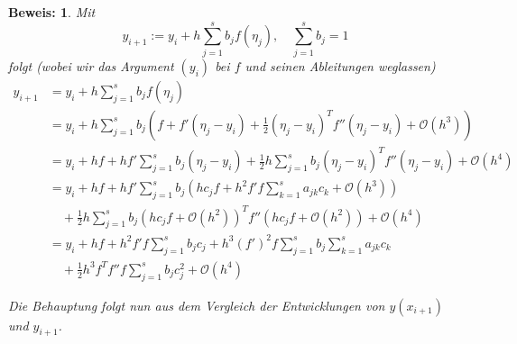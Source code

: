 \documentclass[
]{mycourse}
\theoremstyle{mythm}
\theoremstyle{break}
\newtheorem*{beweis}{Beweis:}
\begin{document}
\begin{beweis}
Mit 
\[
y_{i+1}:=y_i +  h \sum_{j=1}^s b_j f(\eta_j), \quad \sum_{j=1}^s b_j=1
\]
folgt (wobei wir das Argument $(y_i)$ bei $f$ und seinen Ableitungen weglassen)
\begin{align*}
y_{i+1} &= y_i +  h \sum_{j=1}^s b_j f(\eta_j)\\
&=  y_i + h  \sum_{j=1}^s b_j \left( f + f' (\eta_j-y_i) + \frac{1}{2} (\eta_j-y_i)^T f'' (\eta_j-y_i)  + \mathcal{O}(h^3) \right)\\
&= y_i + h f + h f'  \sum_{j=1}^s b_j  (\eta_j-y_i) + \frac{1}{2} h \sum_{j=1}^s b_j (\eta_j-y_i)^T f'' (\eta_j-y_i) + \mathcal{O}(h^4)\\
&= y_i + h f + h f'  \sum_{j=1}^s b_j  \left( h c_j f + h^2 f' f \sum_{k=1}^s a_{jk} c_k + \mathcal{O}(h^3)\right)\\
& \quad {}   + \frac{1}{2} h \sum_{j=1}^s b_j \left( h c_j f + \mathcal{O}(h^2)\right)^T f'' \left( h c_j f + \mathcal{O}(h^2) \right) + \mathcal{O}(h^4)\\
&= y_i + h f + h^2 f' f  \sum_{j=1}^s b_j  c_j + h^3 (f')^2 f \sum_{j=1}^s b_j \sum_{k=1}^s a_{jk} c_k\\
& \quad {} + \frac{1}{2} h^3 f^T f'' f \sum_{j=1}^s b_j c_j^2 + \mathcal{O}(h^4)
\end{align*}

Die Behauptung folgt nun aus dem Vergleich der Entwicklungen von $y(x_{i+1})$ und $y_{i+1}$.
\end{beweis}
\end{document}
